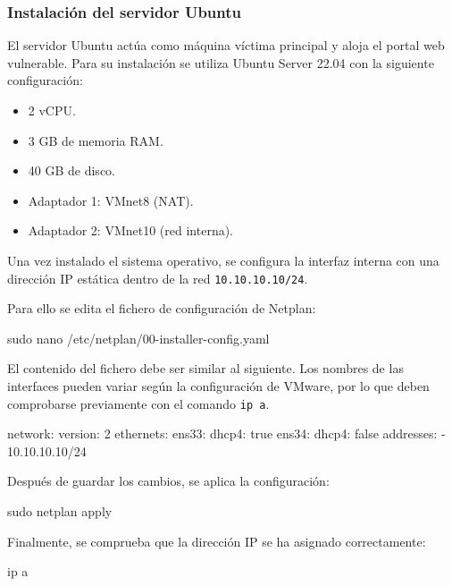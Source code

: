 \subsubsection*{Instalación del servidor Ubuntu}

El servidor Ubuntu actúa como máquina víctima principal y aloja el portal web vulnerable. Para su instalación se utiliza Ubuntu Server 22.04 con la siguiente configuración:

\begin{itemize}
    \item 2 vCPU.
    \item 3 GB de memoria RAM.
    \item 40 GB de disco.
    \item Adaptador 1: VMnet8 (NAT).
    \item Adaptador 2: VMnet10 (red interna).
\end{itemize}


Una vez instalado el sistema operativo, se configura la interfaz interna con una dirección IP estática dentro de la red \texttt{10.10.10.10/24}.

Para ello se edita el fichero de configuración de Netplan:

\begin{bashbox}
sudo nano /etc/netplan/00-installer-config.yaml
\end{bashbox}

El contenido del fichero debe ser similar al siguiente. Los nombres de las interfaces pueden variar según la configuración de VMware, por lo que deben comprobarse previamente con el comando \texttt{ip a}.

\begin{configbox}
network:
    version: 2
    ethernets:
    ens33:
        dhcp4: true
    ens34:
        dhcp4: false
        addresses:
        - 10.10.10.10/24
\end{configbox}

Después de guardar los cambios, se aplica la configuración:

\begin{bashbox}
sudo netplan apply
\end{bashbox}

Finalmente, se comprueba que la dirección IP se ha asignado correctamente:

\begin{bashbox}
ip a
\end{bashbox}


